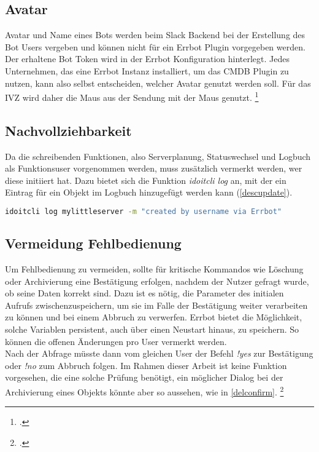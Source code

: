 \subsection{Avatar}
Avatar und Name eines Bots werden beim Slack Backend bei der Erstellung des Bot Users vergeben und können nicht für ein Errbot Plugin vorgegeben werden. Der erhaltene Bot Token wird in der Errbot Konfiguration hinterlegt. Jedes Unternehmen, das eine Errbot Instanz installiert, um das \acs{CMDB} Plugin zu nutzen, kann also selbst entscheiden, welcher Avatar genutzt werden soll. Für das IVZ wird daher die Maus aus der Sendung mit der Maus genutzt. 
\footcite[Vgl.][o. \pno]{Slack_2019_Bots}

\subsection{Nachvollziehbarkeit} \label{Nachvollziehbarkeit}
Da die schreibenden Funktionen, also Serverplanung, Statuswechsel und Logbuch als Funktionsuser vorgenommen werden, muss zusätzlich vermerkt werden, wer diese initiiert hat. Dazu bietet sich die Funktion \textit{idoitcli log} an, mit der ein Eintrag für ein Objekt im Logbuch hinzugefügt werden kann (\autoref{descupdate}). 

\begin{lstlisting}[language=bash, label=descupdate, caption=Hinzufügen eines Logbuch Eintrages]
idoitcli log mylittleserver -m "created by username via Errbot"
\end{lstlisting}

\subsection{Vermeidung Fehlbedienung}
Um Fehlbedienung zu vermeiden, sollte für kritische Kommandos wie Löschung oder Archivierung eine Bestätigung erfolgen, nachdem der Nutzer gefragt wurde, ob seine Daten korrekt sind. Dazu ist es nötig, die Parameter des initialen Aufrufs zwischenzuspeichern, um sie im Falle der Bestätigung weiter verarbeiten zu können und bei einem Abbruch zu verwerfen. Errbot bietet die Möglichkeit, solche Variablen persistent, auch über einen Neustart hinaus, zu speichern. So können die offenen Änderungen pro User vermerkt werden.\\
Nach der Abfrage müsste dann vom gleichen User der Befehl \textit{!yes} zur Bestätigung oder \textit{!no} zum Abbruch folgen. Im Rahmen dieser Arbeit ist keine Funktion vorgesehen, die eine solche Prüfung benötigt, ein möglicher Dialog bei der Archivierung eines Objekts könnte aber so aussehen, wie in \autoref{delconfirm}. 
\footcite[Vgl.][o. \pno]{errbot_2018_persistence}

